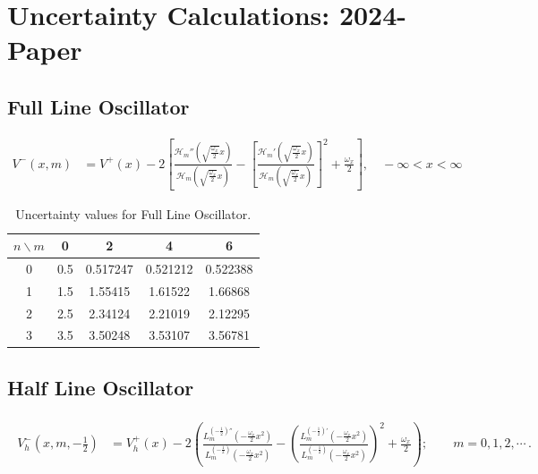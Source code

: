 \documentclass[12pt]{article}
\begin{document}
\section*{Uncertainty Calculations: 2024-Paper}

\subsection*{Full Line Oscillator}


\begin{align}
    \label{FLO:V-}\nonumber
    V^-(x,m)&=V^+(x)-2\left[\frac{\mathcal{H}_m''\left(\sqrt{\frac{\omega_x}{2}} x\right)}{\mathcal{H}_m\left(\sqrt{\frac{\omega_x}{2}} x\right)}-\left[\frac{\mathcal{H}_m'\left(\sqrt{\frac{\omega_x}{2}} x\right)}{\mathcal{H}_m\left(\sqrt{\frac{\omega_x}{2}} x\right)}\right]^2+\frac{\omega_x}{2}\right], \quad -\infty<x<\infty
\end{align}

\begin{table}[h!]
\centering
\begin{tabular}{c|c|c|c|c}
\hline
$n \backslash m$ & 0     & 2       & 4       & 6       \\ \hline
0               & 0.5   & 0.517247 & 0.521212 & 0.522388 \\
1               & 1.5   & 1.55415  & 1.61522  & 1.66868  \\
2               & 2.5   & 2.34124  & 2.21019  & 2.12295  \\
3               & 3.5   & 3.50248  & 3.53107  & 3.56781  \\ \hline
\end{tabular}
\caption{Uncertainty values for Full Line Oscillator.}
\label{tab:uncertainty}
\end{table}



\subsection*{Half Line Oscillator}


\begin{align}
\begin{split}\label{HLO:V-alpha-}\nonumber
V_h^-(x,m,-\frac{1}{2}) &= V_h^+(x) - 2\left( \frac{L_m^{(-\frac{1}{2})''}
\left(-\frac{\omega_x}{2} x^2\right)}{L_m^{(-\frac{1}{2})}
\left(-\frac{\omega_x}{2} x^2\right)} - \left( \frac{L_m^{(-\frac{1}{2})'}
\left(-\frac{\omega_x}{2} x^2\right)}{L_m^{(-\frac{1}{2})}
\left(-\frac{\omega_x}{2} x^2\right)} \right)^2 + \frac{\omega_x}{2} \right);
\qquad m=0,1,2,\cdots \,.
    \end{split}
\end{align}
\end{document}
